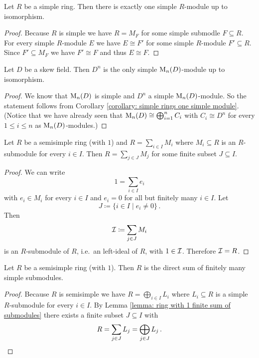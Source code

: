 \begin{corollary}\label{corollary: simple rings one simple module}
  Let $R$ be a simple ring.
  Then there is exactly one simple $R$-module up to isomorphism.
\end{corollary}
\begin{proof}
  Because $R$ is simple we have $R = M_F$ for some simple submodle $F \subseteq R$.
  For every simple $R$-module $E$ we have $E \cong F'$ for some simple $R$-module $F' \subseteq R$.
  Since $F' \subseteq M_F$ we have $F' \cong F$ and thus $E \cong F$.
\end{proof}


\begin{corollary}\label{corollary: D^n only simple M_n(D)-module}
  Let $D$ be a skew field.
  Then $D^n$ is the only simple $\operatorname{M}_n(D)$-module up to isomorphism.
\end{corollary}
\begin{proof}
  We know that $\operatorname{M}_n(D)$ is simple and $D^n$ a simple $\operatorname{M}_n(D)$-module.
  So the statement follows from Corollary \ref{corollary: simple rings one simple module}.
  (Notice that we have already seen that $\operatorname{M}_n(D) \cong \bigoplus_{i=1}^n C_i$ with $C_i \cong D^n$ for every $1 \leq i \leq n$ as $\operatorname{M}_n(D)$-modules.)
\end{proof}


\begin{lemma}\label{lemma: ring with 1 finite sum of submodules}
  Let $R$ be a semisimple ring (with $1$) and $R = \sum_{i \in I} M_i$ where $M_i \subseteq R$ is an $R$-submodule for every $i \in I$.
  Then $R = \sum_{j \in J} M_j$ for some finite subset $J \subseteq I$.
\end{lemma}
\begin{proof}
  We can write
  \[
      1
    = \sum_{i \in I} e_i
  \]
  with $e_i \in M_i$ for every $i \in I$ and $e_i = 0$ for all but finitely many $i \in I$. Let
  \[
              J
    \coloneqq \{i \in I \mid e_i \neq 0\} \,.
  \]
  Then
  \[
              \mathcal{I}
    \coloneqq \sum_{j \in J} M_i
  \]
  is an $R$-submodule of $R$, i.e.\ an left-ideal of $R$, with $1 \in \mathcal{I}$.
  Therefore $\mathcal{I} = R$.
\end{proof}


\begin{corollary}\label{lemma: semisimple ring with 1 only finitely many summands}
  Let $R$ be a semisimple ring (with $1$).
  Then $R$ is the direct sum of finitely many simple submodules.
\end{corollary}
\begin{proof}
  Because $R$ is semisimple we have $R = \bigoplus_{i \in I} L_i$ where $L_i \subseteq R$ is a simple $R$-submodule for every $i \in I$.
  By Lemma \ref{lemma: ring with 1 finite sum of submodules} there exists a finite subset $J \subseteq I$ with
  \[
      R
    = \sum_{j \in J} L_j
    = \bigoplus_{j \in J} L_j \,.
    \qedhere
  \]
\end{proof}





